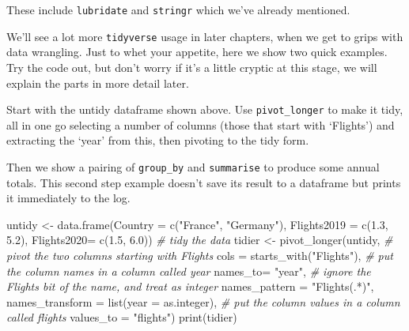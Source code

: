 \documentclass[
]{book}
\newenvironment{Shaded}{\begin{snugshade}}{\end{snugshade}}
\newcommand{\AttributeTok}[1]{\textcolor[rgb]{0.77,0.63,0.00}{#1}}
\newcommand{\CommentTok}[1]{\textcolor[rgb]{0.56,0.35,0.01}{\textit{#1}}}
\newcommand{\FloatTok}[1]{\textcolor[rgb]{0.00,0.00,0.81}{#1}}
\newcommand{\FunctionTok}[1]{\textcolor[rgb]{0.00,0.00,0.00}{#1}}
\newcommand{\NormalTok}[1]{#1}
\newcommand{\OtherTok}[1]{\textcolor[rgb]{0.56,0.35,0.01}{#1}}
\newcommand{\StringTok}[1]{\textcolor[rgb]{0.31,0.60,0.02}{#1}}
\begin{document}
These include \texttt{lubridate} and \texttt{stringr} which we've already mentioned.

We'll see a lot more \texttt{tidyverse} usage in later chapters, when we get to grips with data wrangling. Just to whet your appetite, here we show two quick examples. Try the code out, but don't worry if it's a little cryptic at this stage, we will explain the parts in more detail later.

Start with the untidy dataframe shown above. Use \texttt{pivot\_longer} to make it tidy, all in one go selecting a number of columns (those that start with `Flights') and extracting the `year' from this, then pivoting to the tidy form.

Then we show a pairing of \texttt{group\_by} and \texttt{summarise} to produce some annual totals. This second step example doesn't save its result to a dataframe but prints it immediately to the log.

\begin{Shaded}
\begin{Highlighting}[]
\NormalTok{untidy }\OtherTok{\textless{}{-}} \FunctionTok{data.frame}\NormalTok{(}\AttributeTok{Country =} \FunctionTok{c}\NormalTok{(}\StringTok{"France"}\NormalTok{, }\StringTok{"Germany"}\NormalTok{), }
                     \AttributeTok{Flights2019 =} \FunctionTok{c}\NormalTok{(}\FloatTok{1.3}\NormalTok{, }\FloatTok{5.2}\NormalTok{), }
                     \AttributeTok{Flights2020=} \FunctionTok{c}\NormalTok{(}\FloatTok{1.5}\NormalTok{, }\FloatTok{6.0}\NormalTok{))}
\CommentTok{\# tidy the data}
\NormalTok{tidier }\OtherTok{\textless{}{-}} \FunctionTok{pivot\_longer}\NormalTok{(untidy, }
                       \CommentTok{\# pivot the two columns starting with \textquotesingle{}Flights\textquotesingle{}}
                       \AttributeTok{cols =} \FunctionTok{starts\_with}\NormalTok{(}\StringTok{"Flights"}\NormalTok{),}
                       \CommentTok{\# put the column names in a column called \textquotesingle{}year\textquotesingle{}}
                       \AttributeTok{names\_to=} \StringTok{"year"}\NormalTok{,}
                       \CommentTok{\# ignore the \textquotesingle{}Flights\textquotesingle{} bit of the name, and treat as integer}
                       \AttributeTok{names\_pattern =} \StringTok{"Flights(.*)"}\NormalTok{,}
                       \AttributeTok{names\_transform =} \FunctionTok{list}\NormalTok{(}\AttributeTok{year =}\NormalTok{ as.integer),}
                       \CommentTok{\# put the column values in a column called \textquotesingle{}flights\textquotesingle{}}
                       \AttributeTok{values\_to =} \StringTok{"flights"}\NormalTok{)}
\FunctionTok{print}\NormalTok{(tidier)}
\end{Highlighting}
\end{Shaded}
\end{document}
